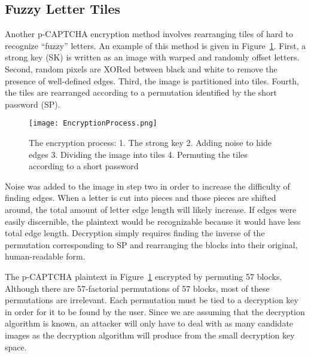 \documentclass[12pt]{article}
\begin{document}

\subsection*{Fuzzy Letter Tiles}
	Another p-CAPTCHA encryption method involves rearranging tiles of hard to recognize “fuzzy” letters. An example of this method is given in Figure~{\ref{EncryptionProcess}}. First, a strong key (SK) is written as an image with warped and randomly offset letters. Second, random pixels are XORed between black and white to remove the presence of well-defined edges. Third, the image is partitioned into tiles. Fourth, the tiles are rearranged according to a permutation identified by the short password (SP).

\begin{figure}
	\begin{center}
		\texttt{[image: EncryptionProcess.png]}
	\end{center}
	\caption{The encryption process: 1. The strong key 2. Adding noise to hide edges 3. Dividing the image into tiles 4. Permuting the tiles according to a short password}
\label{EncryptionProcess}
\end{figure}

Noise was added to the image in step two in order to increase the difficulty of finding edges. When a letter is cut into pieces and those pieces are shifted around, the total amount of letter edge length will likely increase. If edges were easily discernible, the plaintext would be recognizable because it would have less total edge length. Decryption simply requires finding the inverse of the permutation corresponding to SP and rearranging the blocks into their original, human-readable form.

The p-CAPTCHA plaintext in Figure~{\ref{EncryptionProcess}} encrypted by permuting 57 blocks. Although there are 57-factorial permutations of 57 blocks, most of these permutations are irrelevant. Each permutation must be tied to a decryption key in order for it to be found by the user. Since we are assuming that the decryption algorithm is known, an attacker will only have to deal with as many candidate images as the decryption algorithm will produce from the small decryption key space.
\end{document}

